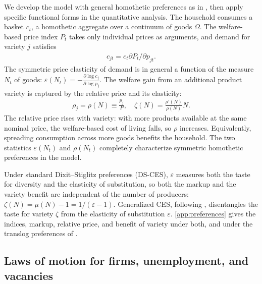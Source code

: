 \documentclass[authoryear, review, 12pt]{elsarticle}
\newcommand{\der}[2]{\frac{\partial #1}{\partial #2}}
\begin{document}
	We develop the model with general homothetic preferences as in 
	\citet{bilbiie_2012}, then apply specific functional forms in the 
	quantitative analysis. The household consumes a basket $c_t$, a 
	homothetic aggregate over a continuum of goods $\Omega$. The 
	welfare-based price index $P_t$ takes only individual prices as 
	arguments, and demand for variety $j$ satisfies
	\begin{align}\label{eq:demand}
		c_{jt}=c_t\partial P_t/\partial p_{jt}.
	\end{align}
	The symmetric price elasticity of demand is in general a function 
	of the measure $N_t$ of goods:
		$\varepsilon(N_t)=-\der{\log c_{j}}{\log p_{j}}$.
	The welfare gain from an additional product variety is captured by 
	the relative price and its elasticity:
	\begin{align}\label{eq:relative_price}
		\rho_{j}=\rho(N)\equiv \frac{p_{j}}{P},\quad 
		\zeta(N)=\frac{\rho'(N)}{\rho(N)}N.
	\end{align}
	The relative price rises with variety: with more products available 
	at the same nominal price, the welfare-based cost of living falls, 
	so $\rho$ increases. Equivalently, spreading consumption across 
	more goods benefits the household. The two statistics 
	$\varepsilon(N_t)$ and $\rho(N_t)$ completely characterize 
	symmetric homothetic preferences in the model.
	
	Under standard Dixit--Stiglitz preferences (DS-CES), $\varepsilon$ 
	measures both the taste for diversity and the elasticity of 
	substitution, so both the markup and the variety benefit are 
	independent of the number of producers: 
	$\zeta(N)=\mu(N)-1=1/(\varepsilon-1)$. Generalized CES, following
	\citet{benassy_1996}, disentangles the taste for variety $\zeta$ from the elasticity of
	substitution $\varepsilon$. \ref{app:preferences} gives the indices, markup, relative
	price, and benefit of variety under both, and under the translog preferences of
	\citet{feenstra_2003}.
	
	\subsection{Laws of motion for firms, unemployment, and vacancies}
	
\end{document}
